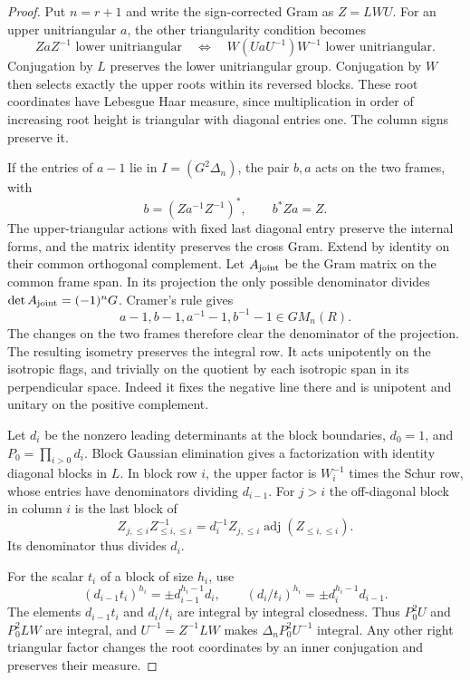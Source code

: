 \begin{proof}
Put \(n=r+1\) and write the sign-corrected Gram as \(Z=LWU\).
For an upper unitriangular \(a\), the other triangularity condition
becomes
\[
 ZaZ^{-1}\text{ lower unitriangular}
 \quad\Longleftrightarrow\quad
 W(UaU^{-1})W^{-1}\text{ lower unitriangular}.
\]
Conjugation by \(L\) preserves the lower unitriangular group.
Conjugation by \(W\) then selects exactly the upper roots within
its reversed blocks. These root coordinates
have Lebesgue Haar measure, since multiplication in
order of increasing root height is triangular with
diagonal entries one. The column signs preserve it.


If the entries of \(a-1\) lie in \(I=(G^2\Delta_n)\),
the pair \(b,a\) acts on the two frames, with
\[
      b=(Za^{-1}Z^{-1})^*,\qquad b^*Za=Z .
\]
The upper-triangular actions with fixed last diagonal entry preserve
the internal forms, and the matrix identity preserves the cross
Gram. Extend by identity on their
common orthogonal complement. Let \(A_{\rm joint}\) be the Gram matrix on the common frame
span. In its projection the only possible denominator divides
\(\det A_{\rm joint}=(-1)^nG\). Cramer's rule gives
\[
  a-1, b-1, a^{-1}-1, b^{-1}-1\in G M_n(R).
\]
The changes on the two frames therefore clear the denominator
of the projection. The resulting isometry preserves the
integral row. It acts unipotently on the isotropic
flags, and trivially on the quotient by each
isotropic span in its perpendicular space.
Indeed it fixes the negative line there and is
unipotent and unitary on the positive complement.


Let \(d_i\) be the nonzero leading determinants at
the block boundaries, \(d_0=1\), and \(P_0=\prod_{i>0}d_i\).
Block Gaussian elimination gives a factorization with
identity diagonal blocks in \(L\). In block row \(i\),
the upper factor is \(W_i^{-1}\) times the Schur row,
whose entries have denominators dividing \(d_{i-1}\).
For \(j>i\) the off-diagonal block in column \(i\) is the
last block of
\[
   Z_{j,\le i}Z_{\le i,\le i}^{-1}
     =d_i^{-1} Z_{j,\le i}\operatorname{adj}(Z_{\le i,\le i}).
\]
Its denominator thus divides \(d_i\).

For the scalar \(t_i\) of a block of size \(h_i\), use
\[
 (d_{i-1}t_i)^{h_i}=\pm d_{i-1}^{h_i-1}d_i,\qquad
 (d_i/t_i)^{h_i}=\pm d_i^{h_i-1}d_{i-1}.
\]
The elements \(d_{i-1}t_i\) and \(d_i/t_i\) are integral by
integral closedness. Thus \(P_0^2U\) and \(P_0^2LW\) are integral,
and \(U^{-1}=Z^{-1}LW\) makes \(\Delta_nP_0^2U^{-1}\) integral. Any other right triangular factor
changes the root coordinates by an inner conjugation
and preserves their measure.


\end{proof}
